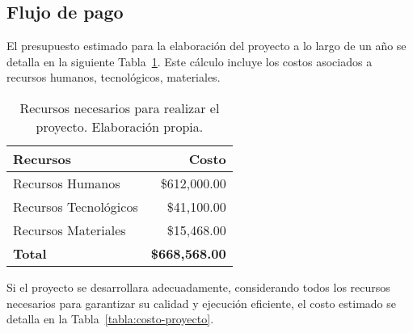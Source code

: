 \subsection{Flujo de pago}
El presupuesto estimado para la elaboración del proyecto a lo largo de un año se detalla en la siguiente  Tabla~\ref{tabla:flujo-pago}. Este cálculo incluye los costos asociados a recursos humanos, tecnológicos, materiales. 

\begin{table}[h!]
	\centering
	\begin{tabular}{|l|r|}
		\hline
		\textbf{Recursos}          & \textbf{Costo}  \\ \hline
		Recursos Humanos           & \$612,000.00     \\ \hline
		Recursos Tecnológicos      & \$41,100.00      \\ \hline
		Recursos Materiales        & \$15,468.00      \\ \hline
		\textbf{Total}             & \textbf{\$668,568.00} \\ \hline
	\end{tabular}
	\caption{Recursos necesarios para realizar el proyecto. Elaboración propia.}
	\label{tabla:flujo-pago}
\end{table}

Si el proyecto se desarrollara adecuadamente, considerando todos los recursos necesarios para garantizar su calidad y ejecución eficiente, el costo estimado se detalla en la Tabla~\ref{tabla:costo-proyecto}.


